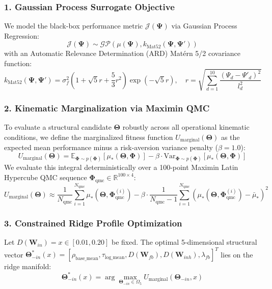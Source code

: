 \documentclass[11pt,a4paper]{article}
\begin{document}
\subsubsection{1. Gaussian Process Surrogate Objective}
We model the black-box performance metric $\mathcal{J}(\boldsymbol{\Psi})$ via Gaussian Process Regression:
\begin{equation}
\mathcal{J}(\boldsymbol{\Psi}) \sim \mathcal{GP}\left( \mu(\boldsymbol{\Psi}), k_{\text{Mat52}}(\boldsymbol{\Psi}, \boldsymbol{\Psi}') \right)
\end{equation}
with an Automatic Relevance Determination (ARD) Mat\'ern 5/2 covariance function:
\begin{equation}
k_{\text{Mat52}}(\boldsymbol{\Psi}, \boldsymbol{\Psi}') = \sigma_f^2 \left( 1 + \sqrt{5}r + \frac{5}{3}r^2 \right) \exp(-\sqrt{5}r), \quad r = \sqrt{\sum_{d=1}^{10} \frac{(\Psi_d - \Psi'_d)^2}{l_d^2}}
\end{equation}

\subsubsection{2. Kinematic Marginalization via Maximin QMC}
To evaluate a structural candidate $\boldsymbol{\Theta}$ robustly across all operational kinematic conditions, we define the marginalized fitness function $U_{\text{marginal}}(\boldsymbol{\Theta})$ as the expected mean performance minus a risk-aversion variance penalty ($\beta = 1.0$):
\begin{equation}
U_{\text{marginal}}(\boldsymbol{\Theta}) = \mathbb{E}_{\boldsymbol{\Phi} \sim p(\boldsymbol{\Phi})}[\mu_*(\boldsymbol{\Theta}, \boldsymbol{\Phi})] - \beta \cdot \text{Var}_{\boldsymbol{\Phi} \sim p(\boldsymbol{\Phi})}[\mu_*(\boldsymbol{\Theta}, \boldsymbol{\Phi})]
\end{equation}
We evaluate this integral deterministically over a 100-point Maximin Latin Hypercube QMC sequence $\boldsymbol{\Phi}_{\text{qmc}} \in \mathbb{R}^{100 \times 4}$:
\begin{equation}
U_{\text{marginal}}(\boldsymbol{\Theta}) \approx \frac{1}{N_{\text{qmc}}} \sum_{i=1}^{N_{\text{qmc}}} \mu_*(\boldsymbol{\Theta}, \boldsymbol{\Phi}_{\text{qmc}}^{(i)}) - \beta \cdot \frac{1}{N_{\text{qmc}}-1} \sum_{i=1}^{N_{\text{qmc}}} \left( \mu_*(\boldsymbol{\Theta}, \boldsymbol{\Phi}_{\text{qmc}}^{(i)}) - \bar{\mu}_* \right)^2
\end{equation}

\subsubsection{3. Constrained Ridge Profile Optimization}
Let $D(\mathbf{W}_{in}) = x \in [0.01, 0.20]$ be fixed. The optimal 5-dimensional structural vector $\boldsymbol{\Theta}_{-in}^*(x) = [\rho_{\text{base\_mean}}, \tau_{\text{log\_mean}}, D(\mathbf{W}_{fb}), D(\mathbf{W}_{inh}), \lambda_{fb}]^T$ lies on the ridge manifold:
\begin{equation}
\boldsymbol{\Theta}_{-in}^*(x) = \arg\max_{\boldsymbol{\Theta}_{-in} \in \Omega_5} U_{\text{marginal}}(\boldsymbol{\Theta}_{-in}, x)
\end{equation}
\end{document}
